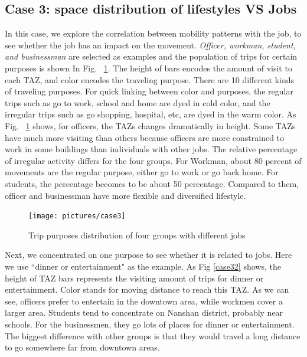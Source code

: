 \documentclass{ieeeaccess}
\begin{document}
\subsection{Case 3: space distribution of lifestyles VS Jobs}
In this case, we explore the correlation between mobility patterns with the job, to see whether the job has an impact on the movement. \textit{Officer, workman, student, and businessman} are selected as examples and the population of trips for certain purposes is shown In Fig. ~\ref{case3}. The height of bars encodes the amount of visit to each TAZ, and color encodes the traveling purpose. There are 10 different kinds of traveling purposes. For quick linking between color and purposes, the regular trips such as go to work, school and home are dyed in cold color, and the irregular trips such as go shopping, hospital, etc, are dyed in the warm color. As Fig. ~\ref{case3} shows, for officers, the TAZs changes dramatically in height. Some TAZs have much more visiting than others because officers are more constrained to work in some buildings than individuals with other jobs. The relative percentage of irregular activity differs for the four groups. For Workman, about 80 percent of movements are the regular purpose, either go to work or go back home. For students, the percentage becomes to be about 50 percentage. Compared to them, officer and businessman have more flexible and diversified lifestyle.

\begin{figure}[htb!]
 \centering %
 \texttt{[image: pictures/case3]}
 \caption{Trip purposes distribution of four groups with different jobs}
 \label{case3}
\end{figure}

Next, we concentrated on one purpose to see whether it is related to jobs. Here we use ``dinner or entertainment" as the example. As Fig \ref{case32} shows, the height of TAZ bars represents the visiting amount of trips for dinner or entertainment. Color stands for moving distance to reach this TAZ. As we can see, officers prefer to entertain in the downtown area, while workmen cover a larger area. Students tend to concentrate on Nanshan district, probably near schools. For the businessmen, they go lots of places for dinner or entertainment. The biggest difference with other groups is that they would travel a long distance to go somewhere far from downtown areas.
\end{document}
